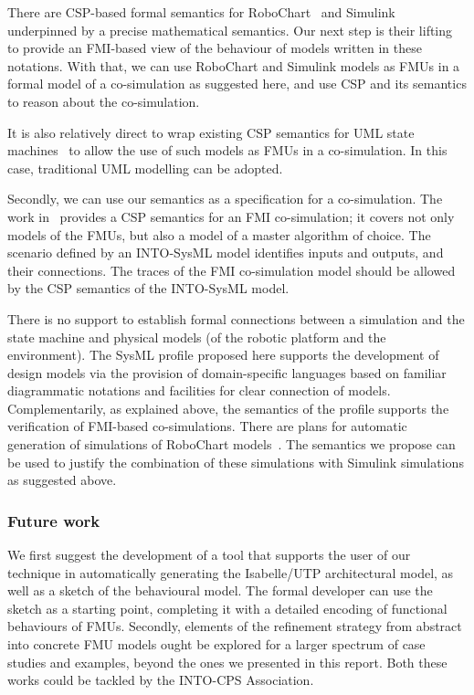 There are CSP-based formal semantics for RoboChart~\cite{MiyazawaCRLWT2016} and Simulink~\cite{MarriottZC2012,CavalcantiMW2013} underpinned by a precise mathematical semantics. Our next step is their lifting to provide an FMI-based view of the behaviour of models written in these notations. With that, we can use RoboChart and Simulink models as FMUs in a formal model of a co-simulation as suggested here, and use CSP and its semantics to reason about the co-simulation.

It is also relatively direct to wrap existing CSP semantics for UML state machines~\cite{DaviesC2003,RaschW2005} to allow the use of such models as FMUs in a co-simulation. In this case, traditional UML modelling can be adopted.

Secondly, we can use our semantics as a specification for a co-simulation. The work in~\cite{CavalcantiWA16} provides a CSP semantics for an FMI co-simulation; it covers not only models of the FMUs, but also a model of a master algorithm of choice. The scenario defined by an INTO-SysML model identifies inputs and outputs, and their connections. The traces of the FMI co-simulation model should be allowed by the CSP semantics of the INTO-SysML model.

There is no support to establish formal connections between a simulation and the state machine and physical models (of the robotic platform and the environment). The SysML profile proposed here supports the development of design models via the provision of domain-specific languages based on familiar diagrammatic notations and facilities for clear connection of models. Complementarily, as explained above, the semantics of the profile supports the verification of FMI-based co-simulations.  There are plans for automatic generation of simulations of RoboChart models~\cite{CavalcantiWA16}. The semantics we propose can be used to justify the combination of these simulations with Simulink simulations as suggested above.

\subsubsection{Future work}

We first suggest the development of a tool that supports the user of our technique in automatically generating the Isabelle/UTP architectural model, as well as a sketch of the behavioural model. The formal developer can use the sketch as a starting point, completing it with a detailed encoding of functional behaviours of FMUs. Secondly, elements of the refinement strategy from abstract into concrete FMU models ought be explored for a larger spectrum of case studies and examples, beyond the ones we presented in this report. Both these works could be tackled by the INTO-CPS Association.
